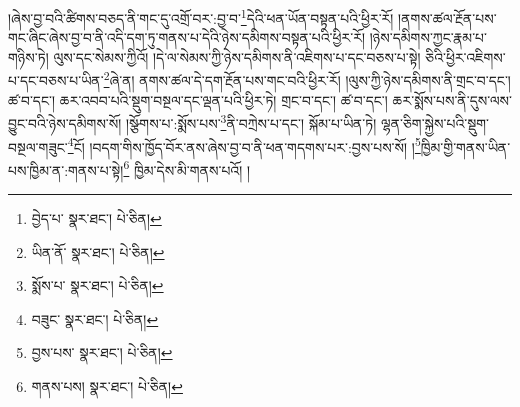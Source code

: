 །ཞེས་བྱ་བའི་ཚིགས་བཅད་ནི་གང་དུ་འགྲོ་བར་:བྱ་བ་\footnote{བྱེད་པ་  སྣར་ཐང་།  པེ་ཅིན། }དེའི་ཕན་ཡོན་བསྟན་པའི་ཕྱིར་རོ། །ནགས་ཚལ་རྔོན་པས་གང་ཞིང་ཞེས་བྱ་བ་ནི་འདི་དག་ཏུ་གནས་པ་དེའི་ཉེས་དམིགས་བསྟན་པའི་ཕྱིར་རོ། །ཉེས་དམིགས་ཀྱང་རྣམ་པ་གཉིས་ཏེ། ལུས་དང་སེམས་ཀྱིའོ། །དེ་ལ་སེམས་ཀྱི་ཉེས་དམིགས་ནི་འཇིགས་པ་དང་བཅས་པ་སྟེ། ཅིའི་ཕྱིར་འཇིགས་པ་དང་བཅས་པ་ཡིན་\footnote{ཡིན་ནོ་  སྣར་ཐང་།  པེ་ཅིན། }ཞེ་ན། ནགས་ཚལ་དེ་དག་རྔོན་པས་གང་བའི་ཕྱིར་རོ། །ལུས་ཀྱི་ཉེས་དམིགས་ནི་གྲང་བ་དང་། ཚ་བ་དང་། ཆར་འབབ་པའི་སྡུག་བསྔལ་དང་ལྡན་པའི་ཕྱིར་ཏེ། གྲང་བ་དང་། ཚ་བ་དང་། ཆར་སྨོས་པས་ནི་དུས་ལས་བྱུང་བའི་ཉེས་དམིགས་སོ། །སྩོགས་པ་:སྨོས་པས་\footnote{སྨོས་པ་  སྣར་ཐང་།  པེ་ཅིན། }ནི་བཀྲེས་པ་དང་། སྐོམ་པ་ཡིན་ཏེ། ལྷན་ཅིག་སྐྱེས་པའི་སྡུག་བསྔལ་གཟུང་\footnote{བཟུང་  སྣར་ཐང་།  པེ་ཅིན། }ངོ། །བདག་གིས་ཁྱོད་བོར་ནས་ཞེས་བྱ་བ་ནི་ཕན་གདགས་པར་:བྱས་པས་སོ། །\footnote{བྱས་པས་  སྣར་ཐང་།  པེ་ཅིན། }ཁྱིམ་གྱི་གནས་ཡིན་པས་ཁྱིམ་ན་:གནས་པ་སྟེ།\footnote{གནས་པས།  སྣར་ཐང་།  པེ་ཅིན། } ཁྱིམ་དེས་མི་གནས་པའོ། །
